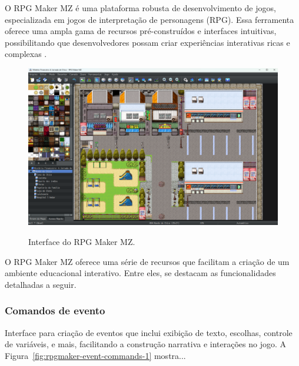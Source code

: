O RPG Maker MZ é uma plataforma robusta de desenvolvimento de jogos, especializada em jogos de interpretação de personagens (RPG). Essa ferramenta oferece uma ampla gama de recursos pré-construídos e interfaces intuitivas, possibilitando que desenvolvedores possam criar experiências interativas ricas e complexas \cite{RPGMakerMZ}.

\begin{figure}[ht]
	\centering
	\caption{Interface do RPG Maker MZ.}
	\includegraphics[scale=0.3]{Textuais/Pictures/RPGMaker_Interface.png}
	\label{fig:rpgmaker-interface}
\end{figure}


O RPG Maker MZ oferece uma série de recursos que facilitam a criação de um ambiente educacional interativo. Entre eles, se destacam as funcionalidades detalhadas a seguir.


\subsubsection*{Comandos de evento}
Interface para criação de eventos que inclui exibição de texto, escolhas, controle de variáveis, e mais, facilitando a construção narrativa e interações no jogo. A Figura~\ref{fig:rpgmaker-event-commands-1} mostra...

